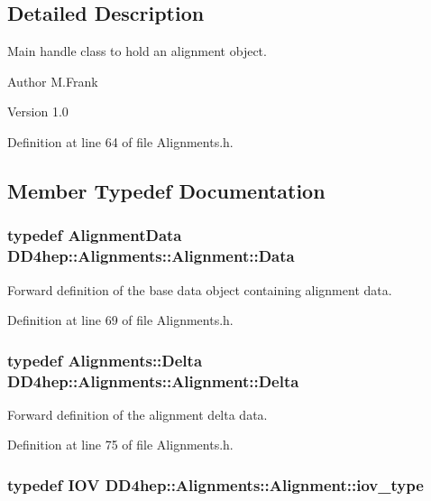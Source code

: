 \subsection{Detailed Description}
Main handle class to hold an alignment object. \begin{DoxyAuthor}{Author}
M.Frank 
\end{DoxyAuthor}
\begin{DoxyVersion}{Version}
1.0 
\end{DoxyVersion}


Definition at line 64 of file Alignments.h.

\subsection{Member Typedef Documentation}
\hypertarget{class_d_d4hep_1_1_alignments_1_1_alignment_a5ff6a2c0b838274552fbac2f52b9a652}{
\subsubsection[{Data}]{\setlength{\rightskip}{0pt plus 5cm}typedef {\bf AlignmentData} {\bf DD4hep::Alignments::Alignment::Data}}}
\label{class_d_d4hep_1_1_alignments_1_1_alignment_a5ff6a2c0b838274552fbac2f52b9a652}


Forward definition of the base data object containing alignment data. 

Definition at line 69 of file Alignments.h.\hypertarget{class_d_d4hep_1_1_alignments_1_1_alignment_a49bf0c4249a3b792bf6a016b1d067f64}{
\subsubsection[{Delta}]{\setlength{\rightskip}{0pt plus 5cm}typedef {\bf Alignments::Delta} {\bf DD4hep::Alignments::Alignment::Delta}}}
\label{class_d_d4hep_1_1_alignments_1_1_alignment_a49bf0c4249a3b792bf6a016b1d067f64}


Forward definition of the alignment delta data. 

Definition at line 75 of file Alignments.h.\hypertarget{class_d_d4hep_1_1_alignments_1_1_alignment_afd988c803da5a514d8fa255784f29462}{
\subsubsection[{iov\_\-type}]{\setlength{\rightskip}{0pt plus 5cm}typedef {\bf IOV} {\bf DD4hep::Alignments::Alignment::iov\_\-type}}}
\label{class_d_d4hep_1_1_alignments_1_1_alignment_afd988c803da5a514d8fa255784f29462}


